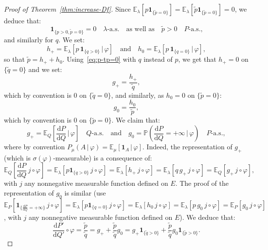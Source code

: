 \documentclass[12pt]{article}
\newcommand{\E}{{\mathbb E}}
\renewcommand{\P}{{\mathbb P}}
\newcommand{\ind}{\mathbf{1}}
\newcommand{\rd}{\mathrm{d}}
\theoremstyle{plain}
\theoremstyle{remark}
\begin{document}
\begin{proof}[Proof of Theorem~\ref{thm:increase-Df}]
Since $\E_\lambda[p \ind_{\{\tilde p =0\}}]= \E_\lambda[\tilde p
\ind_{\{\tilde p =0\}}]= 0$, we deduce that:
\begin{equation}
   \label{eq:p-tp=0}
  \ind_{\{p>0, \tilde p=0\}}=0
  \quad\text{$\lambda$-a.s.}
  \quad\text{as well as}\quad
  \tilde p>0 \quad P\text{-a.s.,}
\end{equation}
and similarly for $q$.
We set:
\[
  h_+= \E_\lambda[ p\,  \ind_{\{q>0\}} \, |\, \varphi]
  \quad\text{and}\quad
  h_0= \E_\lambda[ p\,  \ind_{\{q=0\}} \, |\, \varphi],
\]
so that $\tilde p= h_+ + h_0$. Using~\eqref{eq:p-tp=0} with $q$ instead of $p$, we get that $h_+=0$ on
$\{\tilde q=0\}$ and we set:
\[
  g_+=\frac{h_+}{\tilde q},
\]
which by convention is $0$ on $\{\tilde q=0\}$, and similarly, as $h_0=0$ on
$\{ \tilde p=0\}$:
\[
  g_0= \frac{h_0}{\tilde p},
\]
which by convention is $0$ on $\{\tilde p=0\}$.
We claim that:
\begin{equation}
   \label{eq:g+g0}
  g_+ = \E_Q\left[\frac{\rd P}{\rd Q} \, \big |\, \varphi\right]
  \quad Q\text{-a.s.}
  \quad\text{and}\quad
  g_0= \P\left(\frac{\rd P}{\rd Q}=+\infty  \, \big |\, \varphi\right)
  \quad P\text{-a.s.},
\end{equation}
where by convention $P_\mu(A\, |\, \varphi)=\E_\mu[\ind_A \,|\, \varphi]$.
Indeed, the representation of $g_+$ (which is
$\sigma(\varphi)$-measurable) is a consequence of:
\[
  \E_Q\left[ \frac{\rd P}{\rd Q} \, j \circ \varphi\right]
  = \E_\lambda [p \ind_{\{q>0\}}\, j\circ \varphi]
  = \E_\lambda[h_+ \, j\circ \varphi]
  = \E_\lambda[q \, g_+ \, j\circ \varphi]
  = \E_Q[ g_+ \, j\circ \varphi],
\]
with $j$ any nonnegative measurable function defined on $E$.
The proof of the representation of $g_0$ is similar (use  $
  \E_P\left[\ind_{\{ \frac{\rd P}{\rd Q}=+\infty \}} \, j \circ \varphi\right]
  = \E_\lambda [p \ind_{\{q=0\}}\, j\circ \varphi]
  = \E_\lambda[h_0 \, j\circ \varphi]
  = \E_\lambda[p \, g_0 \, j\circ \varphi]
  = \E_P[ g_0 \, j\circ \varphi]$,
with $j$ any nonnegative measurable function defined on $E$).
 We deduce   that:
\begin{equation}
   \label{eq:P'/Q'}
   \frac{\rd P'}{\rd Q'}\circ \varphi
   = \frac{\tilde p}{\tilde q}
     = g_+  + \frac{\tilde p }{\tilde q} g_0
   = g_+ \ind_{\{\tilde q >0\}} + \frac{\tilde p }{\tilde q} g_0
   \ind_{\{\tilde p >0\}}.
 \end{equation}


\end{proof}
\end{document}
